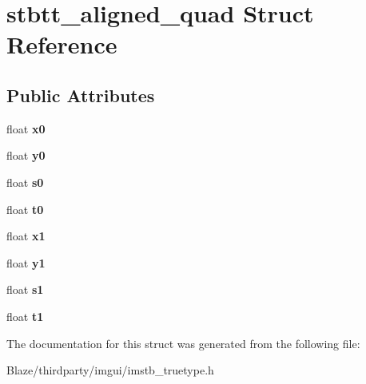 \hypertarget{structstbtt__aligned__quad}{}\section{stbtt\+\_\+aligned\+\_\+quad Struct Reference}
\label{structstbtt__aligned__quad}
\subsection*{Public Attributes}
\begin{DoxyCompactItemize}
\item 
\mbox{\label{structstbtt__aligned__quad_ad74fd8fd69f8a8e1bd20cb0ab7df6e2e}} 
float {\bfseries x0}
\item 
\mbox{\label{structstbtt__aligned__quad_a6178a6b380cf6889893afaeb5019ecd6}} 
float {\bfseries y0}
\item 
\mbox{\label{structstbtt__aligned__quad_ac23b153ff4042deb5499e5a8cacf4a59}} 
float {\bfseries s0}
\item 
\mbox{\label{structstbtt__aligned__quad_a921cd13638a8b3a1e0729021d371da49}} 
float {\bfseries t0}
\item 
\mbox{\label{structstbtt__aligned__quad_a43a7eeac24238e289f825e644331dee6}} 
float {\bfseries x1}
\item 
\mbox{\label{structstbtt__aligned__quad_a66ee8061da982804073a3d2a9114e53c}} 
float {\bfseries y1}
\item 
\mbox{\label{structstbtt__aligned__quad_a26360efee3cdfb5aa2bdc593157b436b}} 
float {\bfseries s1}
\item 
\mbox{\label{structstbtt__aligned__quad_ae1f5ed7333ca5bba46c6a098a05ac75b}} 
float {\bfseries t1}
\end{DoxyCompactItemize}


The documentation for this struct was generated from the following file\+:\begin{DoxyCompactItemize}
\item 
Blaze/thirdparty/imgui/imstb\+\_\+truetype.\+h\end{DoxyCompactItemize}
